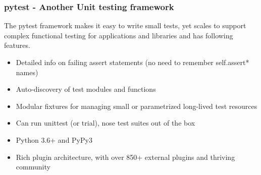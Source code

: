 \documentclass[12pt, a4paper]{report}
\begin{document}
\subsubsection{pytest - Another Unit testing framework}
The pytest framework makes it easy to write small tests, yet scales to support complex functional testing for applications and libraries and has following features.
\begin{itemize}
	\item Detailed info on failing assert statements (no need to remember self.assert* names)
	\item Auto-discovery of test modules and functions
	\item Modular fixtures for managing small or parametrized long-lived test resources
	\item Can run unittest (or trial), nose test suites out of the box
	\item Python 3.6+ and PyPy3
	\item Rich plugin architecture, with over 850+ external plugins and thriving community
\end{itemize}

\newpage
\end{document}

